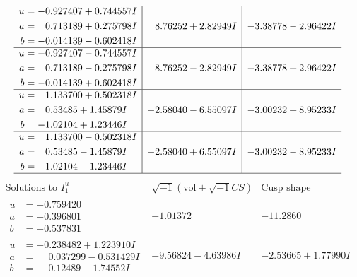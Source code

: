 \documentclass[1p]{elsarticle_modified}
\theoremstyle{definition}
\newcommand{\I}{\sqrt{-1}}
\begin{document}
$$\begin{array}{c|c|c}
\begin{aligned}
u &= -0.927407 + 0.744557 I \\
a &= \phantom{-}0.713189 + 0.275798 I \\
b &= -0.014139 - 0.602418 I\end{aligned}
 & \phantom{-}8.76252 + 2.82949 I & -3.38778 - 2.96422 I \\ \hline\begin{aligned}
u &= -0.927407 - 0.744557 I \\
a &= \phantom{-}0.713189 - 0.275798 I \\
b &= -0.014139 + 0.602418 I\end{aligned}
 & \phantom{-}8.76252 - 2.82949 I & -3.38778 + 2.96422 I \\ \hline\begin{aligned}
u &= \phantom{-}1.133700 + 0.502318 I \\
a &= \phantom{-}0.53485 + 1.45879 I \\
b &= -1.02104 + 1.23446 I\end{aligned}
 & -2.58040 - 6.55097 I & -3.00232 + 8.95233 I \\ \hline\begin{aligned}
u &= \phantom{-}1.133700 - 0.502318 I \\
a &= \phantom{-}0.53485 - 1.45879 I \\
b &= -1.02104 - 1.23446 I\end{aligned}
 & -2.58040 + 6.55097 I & -3.00232 - 8.95233 I\\
 \hline 
 \end{array}$$\newpage$$\begin{array}{c|c|c}  
\text{Solutions to }I^u_{1}& \I (\text{vol} + \sqrt{-1}CS) & \text{Cusp shape}\\
 \hline 
\begin{aligned}
u &= -0.759420\phantom{ +0.000000I} \\
a &= -0.396801\phantom{ +0.000000I} \\
b &= -0.537831\phantom{ +0.000000I}\end{aligned}
 & -1.01372\phantom{ +0.000000I} & -11.2860\phantom{ +0.000000I} \\ \hline\begin{aligned}
u &= -0.238482 + 1.223910 I \\
a &= \phantom{-}0.037299 - 0.531429 I \\
b &= \phantom{-}0.12489 - 1.74552 I\end{aligned}
 & -9.56824 - 4.63986 I & -2.53665 + 1.77990 I \\ \hline\begin{aligned}

\end{aligned}
\end{array}$$
\end{document}
